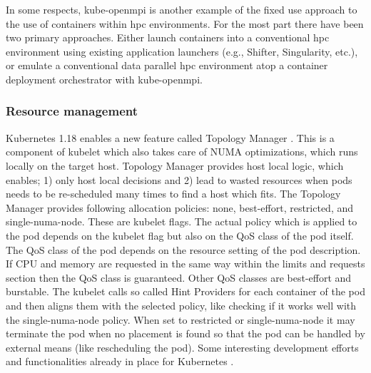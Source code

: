 \documentclass[12pt]{article}
\begin{document}
In some respects, kube-openmpi is another example of the fixed use approach to the use of containers within \gls{hpc} environments. For the most part there have been two primary approaches. Either launch containers into a conventional \gls{hpc} environment using existing application launchers (e.g., Shifter, Singularity, etc.), or emulate a conventional data parallel \gls{hpc} environment atop a container deployment orchestrator with kube-openmpi.

\subsubsection{Resource management}
Kubernetes 1.18 enables a new feature called Topology Manager \cite{gridengine-topology}. This is a component of kubelet which also takes care of NUMA optimizations, which runs locally on the target host. Topology Manager provides host local logic, which enables; 1) only host local decisions and 2) lead to wasted resources when pods needs to be re-scheduled many times to find a host which fits. The Topology Manager provides following allocation policies: none, best-effort, restricted, and single-numa-node. These are kubelet flags. The actual policy which is applied to the pod depends on the kubelet flag but also on the QoS class of the pod itself. The QoS class of the pod depends on the resource setting of the pod description. If CPU and memory are requested in the same way within the limits and requests section then the QoS class is guaranteed. Other QoS classes are best-effort and burstable. The kubelet calls so called Hint Providers for each container of the pod and then aligns them with the selected policy, like checking if it works well with the single-numa-node policy. When set to restricted or single-numa-node it may terminate the pod when no placement is found so that the pod can be handled by external means (like rescheduling the pod). Some interesting development efforts and functionalities already in place for Kubernetes \cite{kubecon-2018}.
\end{document}
